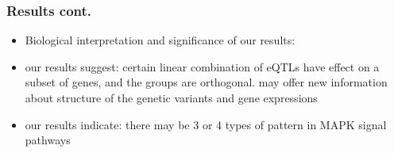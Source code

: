 \begin{frame}
    \frametitle{Results cont.}

    \begin{itemize}
        \item Biological interpretation and significance of our results:
        \item our results suggest:
        certain linear combination of eQTLs have effect on a subset of genes, and the groups are orthogonal. 
        may offer new information about structure of the genetic variants and gene expressions

        \item our results indicate:
        there may be 3 or 4 types of pattern in MAPK signal pathways
    \end{itemize}

\end{frame}